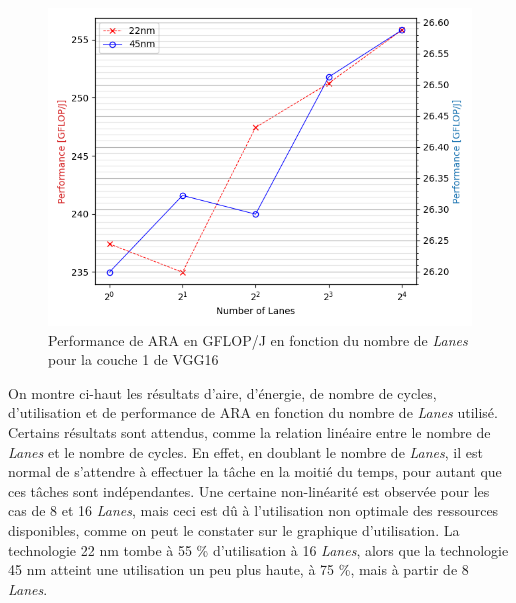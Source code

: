 \documentclass[11pt,letterpaper]{article}
\begin{document}
\begin{multicols}{2}
\begin{figure}[H]
        \label{fig:utilization}
    \end{figure}
    \begin{figure}[H]
        \centering
        \includegraphics[width=\linewidth]{performance.png}
        \caption{Performance de ARA en GFLOP/J en fonction du nombre de \textit{Lanes} pour la couche 1 de VGG16}
        \label{fig:performance}
    \end{figure}

    On montre ci-haut les résultats d'aire, d'énergie, de nombre de cycles, d'utilisation et de performance 
    de ARA en fonction du nombre de \textit{Lanes} utilisé. Certains résultats sont attendus, comme la relation 
    linéaire entre le nombre de \textit{Lanes} et le nombre de cycles. En effet, en doublant le nombre de \textit{Lanes}, 
    il est normal de s'attendre à effectuer la tâche en la moitié du temps, pour autant que ces tâches sont indépendantes.
    Une certaine non-linéarité est observée pour les cas de 8 et 16 \textit{Lanes}, mais ceci est dû à l'utilisation 
    non optimale des ressources disponibles, comme on peut le constater sur le graphique d'utilisation. La technologie 
    22 nm tombe à 55 \% d'utilisation à 16 \textit{Lanes}, alors que la technologie 45 nm atteint une utilisation un peu plus 
    haute, à 75 \%, mais à partir de 8 \textit{Lanes}.


\end{multicols}
\end{document}
